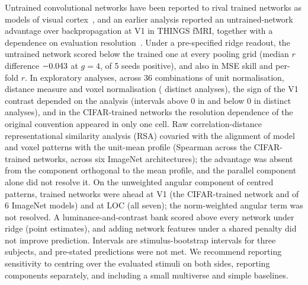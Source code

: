 Untrained convolutional networks have been reported to rival trained networks as models of
visual cortex~\citep{truzzi2020, kazemian2025}, and an earlier analysis reported an untrained-network advantage over backpropagation at V1 in THINGS fMRI, together with a dependence on evaluation resolution~\citep{evalres}. Under a pre-specified
ridge readout, the untrained network scored below the trained one at every pooling grid
(median $r$ difference $-0.043$ at $g = 4$, \PreregRandBpGFourPos{} of 5 seeds
positive), and also in MSE skill and per-fold $r$. In exploratory analyses, across 36 combinations of unit normalisation, distance measure and voxel normalisation (\MultiDistinct{} distinct analyses), the sign of the V1 contrast depended on the analysis (intervals above 0 in \MultiDistinctPos{} and below 0 in \MultiDistinctNeg{} distinct analyses), and in the CIFAR-trained networks the resolution dependence of the original convention appeared in only one cell. Raw correlation-distance representational similarity analysis (RSA) covaried with the alignment of model
and voxel patterns with the unit-mean profile (Spearman \GOneSpearman{} across the CIFAR-trained networks,
\GenOneSpearman{} across six ImageNet architectures); the advantage was absent from the
component orthogonal to the mean profile, and the parallel component alone did not resolve
it. On the unweighted angular component of centred patterns, trained networks were ahead at
V1 (the CIFAR-trained network and \SepThreeModels{} of 6 ImageNet models) and at LOC (all seven); the
norm-weighted angular term was not resolved. A luminance-and-contrast bank scored above every network under ridge (point estimates), and adding network features under a shared penalty did not improve prediction. Intervals are stimulus-bootstrap intervals for three
subjects, and \FailedPredictions{} pre-stated predictions were not met. We recommend reporting sensitivity to centring over the evaluated stimuli on both sides, reporting components separately, and including a small multiverse and simple baselines.
